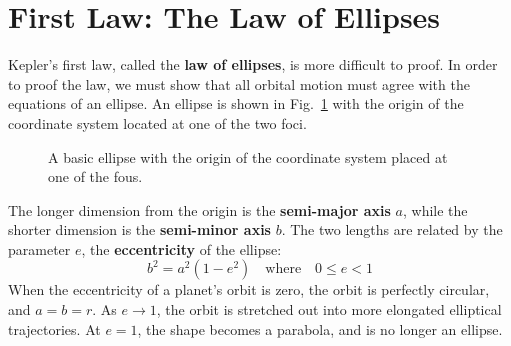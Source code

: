 \documentclass{../../../oss-handout}
\begin{document}
\section{First Law: The Law of Ellipses}
Kepler's first law, called the \textbf{law of ellipses}, is more difficult to
proof. In order to proof the
law, we must show that all orbital motion must agree with the equations of an
ellipse. An ellipse is shown in Fig.~\ref{ellipse1} with the origin of the
coordinate system located at one of the two foci.
\begin{figure}[!ht]
  \centering
  \caption{A basic ellipse with the origin of the coordinate system placed at
    one of the fous.}
  \label{ellipse1}
\end{figure}

The longer dimension from the origin is the \textbf{semi-major axis} $a$, while
the shorter dimension is the \textbf{semi-minor axis} $b$. The two lengths are
related by the parameter $e$, the \textbf{eccentricity} of the ellipse:
\begin{equation}
  b^2=a^2(1-e^2)\quad\text{where}\quad 0\leq e < 1
\end{equation}
When the eccentricity of a planet's orbit is zero, the orbit is perfectly
circular, and $a=b=r$. As $e\rightarrow 1$, the orbit is stretched out into
more elongated elliptical trajectories. At $e=1$, the shape becomes a parabola,
and is no longer an ellipse.
\end{document}
